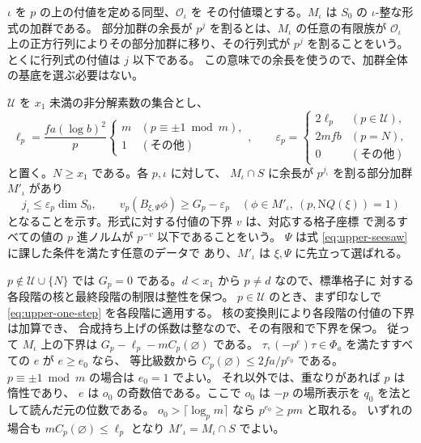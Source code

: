 \(\iota\) を \(p\) の上の付値を定める同型、\(\mathcal O_\iota\) を
その付値環とする。\(M_\iota\) は \(S_0\) の \(\iota\)-整な形式の加群である。
部分加群の余長が \(p^j\) を割るとは、\(M_\iota\) の任意の有限族が
\(\mathcal O_\iota\) 上の正方行列によりその部分加群に移り、その行列式が
\(p^j\) を割ることをいう。とくに行列式の付値は \(j\) 以下である。
この意味での余長を使うので、加群全体の基底を選ぶ必要はない。

\(\mathcal U\) を \(x_1\) 未満の非分解素数の集合とし、
\[
 \ell_p=\frac{fa(\log b)^2}{p}
      \begin{cases} m & (p\equiv\pm1\bmod m),\\1 & (\text{その他}) \end{cases},
 \qquad
 \varepsilon_p=
      \begin{cases}
       2\ell_p &(p\in\mathcal U),\\
       2mfb &(p=N),\\
       0 &(\text{その他})
      \end{cases}
\]
と置く。\(N\ge x_1\) である。各 \(p,\iota\) に対して、
\(M_\iota\cap S\) に余長が \(p^{j_\iota}\) を割る部分加群 \(M'_\iota\) があり
\begin{equation}\label{eq:upper-local}
 j_\iota\le\varepsilon_p\dim S_0,\qquad
 v_p(B_{\xi,\Psi}\phi)\ge G_p-\varepsilon_p
  \quad(\phi\in M'_\iota,\ (p,\mathrm NQ(\xi))=1)
\end{equation}
となることを示す。形式に対する付値の下界 \(v\) は、対応する格子座標
で測るすべての値の \(p\) 進ノルムが \(p^{-v}\) 以下であることをいう。
\(\Psi\) は式 \eqref{eq:upper-seesaw} に課した条件を満たす任意のデータで
あり、\(M'_\iota\) は \(\xi,\Psi\) に先立って選ばれる。

\(p\notin\mathcal U\cup\{N\}\) では \(G_p=0\) である。\(d<x_1\) から
\(p\ne d\) なので、標準格子に
対する各段階の核と最終段階の制限は整性を保つ。
\(p\in\mathcal U\) のとき、まず印なしで
\eqref{eq:upper-one-step} を各段階に適用する。
核の変換則により各段階の付値の下界は加算でき、
合成持ち上げの係数は整なので、その有限和で下界を保つ。
従って \(M_\iota\) 上の下界は \(G_p-\ell_p-mC_p(\varnothing)\) である。
\(\tau,(-p^e)\tau\in\Phi_a\) を満たすすべての \(e\) が \(e\ge e_0\) なら、
等比級数から \(C_p(\varnothing)\le 2fa/p^{e_0}\) である。
\(p\equiv\pm1\bmod m\) の場合は \(e_0=1\) でよい。
それ以外では、重なりがあれば \(p\) は惰性であり、
\(e\) は \(o_0\) の奇数倍である。ここで \(o_0\) は
\(-p\) の場所表示を \(q_0\) を法として読んだ元の位数である。
\(o_0>\lceil\log_p m\rceil\) なら \(p^{e_0}\ge pm\) と取れる。
いずれの場合も \(mC_p(\varnothing)\le\ell_p\) となり
\(M'_\iota=M_\iota\cap S\) でよい。

